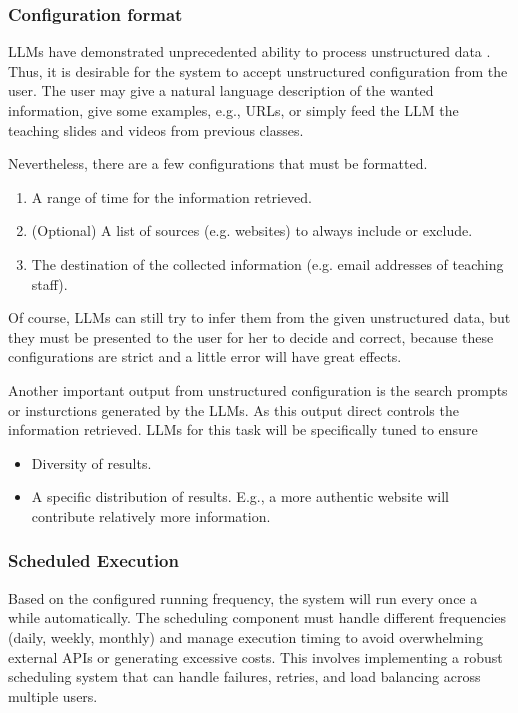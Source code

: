 \documentclass[final-report]{report-template}
\begin{document}
\subsubsection{Configuration format} 
LLMs have demonstrated unprecedented ability to process unstructured data
\cite{llm.unstructured.data.1, llm.unstructured.data.2}. Thus, it is desirable
for the system to accept unstructured configuration from the user. The user may
give a natural language description of the wanted information, give some
examples, e.g., URLs, or simply feed the LLM the teaching slides and videos
from previous classes.

Nevertheless, there are a few configurations that must be formatted.
\begin{enumerate}
	\item A range of time for the information retrieved.
	\item (Optional) A list of sources (e.g. websites) to always include or exclude.
	\item The destination of the collected information (e.g. email addresses of
		teaching staff).
\end{enumerate}
Of course, LLMs can still try to infer them from the given unstructured data,
but they must be presented to the user for her to decide and correct, because
these configurations are strict and a little error will have great effects.

Another important output from unstructured configuration is the search prompts
or insturctions generated by the LLMs. As this output direct controls the
information retrieved. LLMs for this task will be specifically tuned to ensure
\begin{itemize}
	\item Diversity of results.
	\item A specific distribution of results. E.g., a more authentic website
		will contribute relatively more information.
\end{itemize}

\subsubsection{Scheduled Execution} Based on the configured running frequency,
the system will run every once a while automatically. The scheduling component must handle
different frequencies (daily, weekly, monthly) and manage execution timing to
avoid overwhelming external APIs or generating excessive costs. This involves
implementing a robust scheduling system that can handle failures, retries, and
load balancing across multiple users.
\end{document}
